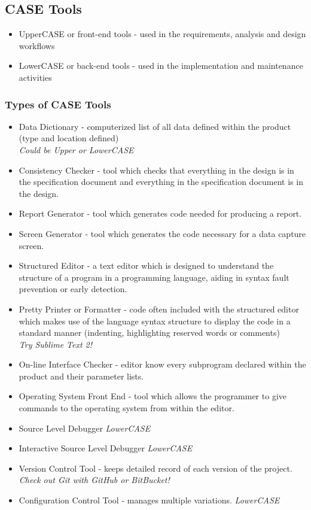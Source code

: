\documentclass{report}
\begin{document}
			\subsection{CASE Tools}
				\begin{itemize}
					\item UpperCASE or front-end tools - used in the requirements, analysis and design workflows
					\item LowerCASE or back-end tools - used in the implementation and maintenance activities
				\end{itemize}
				\subsubsection{Types of CASE Tools}
					\begin{itemize}
						\item Data Dictionary - computerized list of all data defined within the product (type and location defined)\\
							\textit{Could be Upper or LowerCASE}
						\item Consistency Checker - tool which checks that everything in the design is in the specification document and everything in the specification document is in the design.
						\item Report Generator - tool which generates code needed for producing a report.
						\item Screen Generator - tool which generates the code necessary for a data capture screen.
						\item Structured Editor - a text editor which is designed to understand the structure of a program in a programming language, aiding in syntax fault prevention or early detection.
						\item Pretty Printer or Formatter - code often included with the structured editor which makes use of the language syntax structure to display the code in a standard manner (indenting, highlighting reserved words or comments)\\
							\textit{Try Sublime Text 2!}
						\item On-line Interface Checker - editor know every subprogram declared within the product and their parameter lists.
						\item Operating System Front End - tool which allows the programmer to give commands to the operating system from within the editor.
						\item Source Level Debugger \textit{LowerCASE}
						\item Interactive Source Level Debugger \textit{LowerCASE}
						\item Version Control Tool - keeps detailed record of each version of the project.\\
							\textit{Check out Git with GitHub or BitBucket!}
						\item Configuration Control Tool - manages multiple variations. \textit{LowerCASE}
					\end{itemize}
\end{document}
